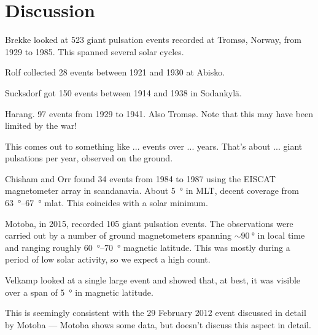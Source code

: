 \section{Discussion}

\todo{$\cdots$}






Brekke\cite{brekke_1987} looked at 523 giant pulsation events recorded at Troms{\o}, Norway, from 1929 to 1985. This spanned several solar cycles. 

Rolf\cite{rolf_1931} collected 28 events between 1921 and 1930 at Abisko. 

Sucksdorf\cite{sucksdorff_1939} got 150 events between 1914 and 1938 in Sodankyl{\"a}. 

Harang\cite{harang_1941}. 97 events from 1929 to 1941. Also Troms{\o}. Note that this may have been limited by the war! 

This comes out to something like ... events over ... years. That's about ... giant pulsations per year, observed on the ground. 


Chisham and Orr\cite{chisham_1991} found 34 events from 1984 to 1987 using the EISCAT magnetometer array in scandanavia. About \SI{5}{\degree} in MLT, decent coverage from \SIrange{63}{67}{\degree} mlat. This coincides with a solar minimum. 

Motoba, in 2015, recorded 105 giant pulsation events. The observations were carried out by a number of ground magnetometers spanning $\sim \SI{90}{\degree}$ in local time and ranging roughly \SIrange{60}{70}{\degree} magnetic latitude\cite{motoba_2015}. This was mostly during a period of low solar activity, so we expect a high count. 


Velkamp\cite{veldkamp_1960} looked at a single large event and showed that, at best, it was visible over a span of \SI{5}{\degree} in magnetic latitude. 

This is seemingly consistent with the 29 February 2012 event discussed in detail by Motoba\cite{motoba_2015} --- Motoba shows some data, but doesn't discuss this aspect in detail. 

